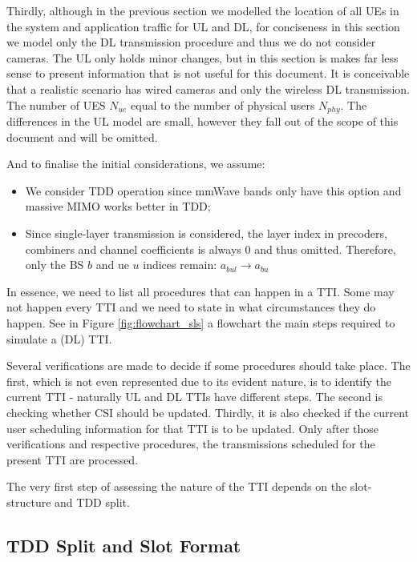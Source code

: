 Thirdly, although in the previous section we modelled the location of all \acsp{UE} in the system and application traffic for \acs{UL} and \acs{DL}, for conciseness in this section we model only the \acs{DL} transmission procedure and thus we do not consider cameras. The \acs{UL} only holds minor changes, but in this section is makes far less sense to present information that is not useful for this document. It is conceivable that a realistic scenario has wired cameras and only the wireless \acs{DL} transmission. The number of UES $N_{ue}$ equal to the number of physical users $N_{phy}$. The differences in the \acs{UL} model are small, however they fall out of the scope of this document and will be omitted.


And to finalise the initial considerations, we assume:
\begin{itemize}
    \item We consider TDD operation since mmWave bands only have this option and massive MIMO works better in TDD;
    \item Since single-layer transmission is considered, the layer index in precoders, combiners and channel coefficients is always 0 and thus omitted. Therefore, only the BS $b$ and ue $u$ indices remain: $a_{bul}\rightarrow a_{bu}$
\end{itemize}

In essence, we need to list all procedures that can happen in a \acs{TTI}. Some may not happen every \acs{TTI} and we need to state in what circumstances they do happen. See in Figure \ref{fig:flowchart_sls} a flowchart the main steps required to simulate a (\acs{DL}) \acs{TTI}.


Several verifications are made to decide if some procedures should take place. The first, which is not even represented due to its evident nature, is to identify the current \acs{TTI} - naturally UL and DL TTIs have different steps. The second is checking whether CSI should be updated. Thirdly, it is also checked if the current user scheduling information for that TTI is to be updated. Only after those verifications and respective procedures, the transmissions scheduled for the present TTI are processed. 

The very first step of assessing the nature of the TTI depends on the slot-structure and TDD split.

\subsection*{TDD Split and Slot Format}


